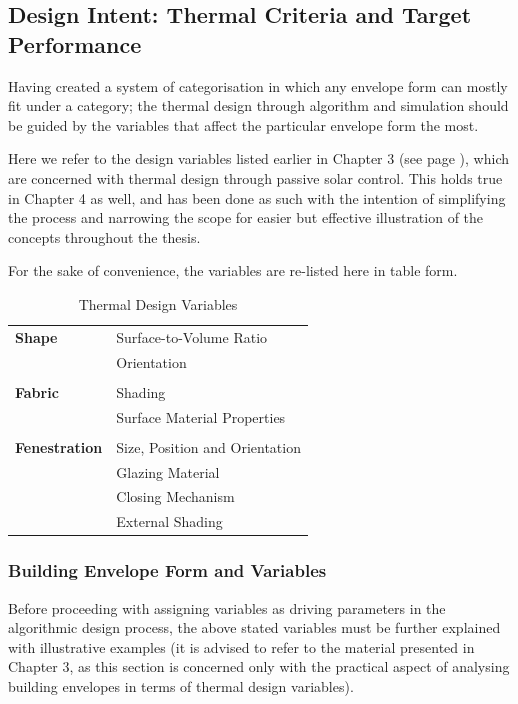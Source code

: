 \clearpage
\subsection{Design Intent: Thermal Criteria and Target Performance}
\label{sec:DesignIntent:Thermal}

Having created a system of categorisation in which any envelope form can mostly fit under a category; the thermal design through algorithm and simulation should be guided by the variables that affect the particular envelope form the most.

Here we refer to the design variables listed earlier in Chapter 3 (see page \pageref{sec:ThermalDesignVariables}), which are concerned with thermal design through passive solar control. This holds true in Chapter 4 as well, and has been done as such with the intention of simplifying the process and narrowing the scope for easier but effective illustration of the concepts throughout the thesis.

For the sake of convenience, the variables are re-listed here in table form.

\begin{table}[H]
	\centering
	\begin{tabular}{l|l}
		\textbf{Shape}		&Surface-to-Volume Ratio\\
					&Orientation\\
					&\\
		\textbf{Fabric} 	&Shading\\
					&Surface Material Properties\\
					&\\
		\textbf{Fenestration}	&Size, Position and Orientation\\
					&Glazing Material\\
					&Closing Mechanism\\
					&External Shading\\
	\end{tabular}
	\caption{Thermal Design Variables}
	\label{tab:ThermalDesignVariables}
\end{table}

\subsubsection{Building Envelope Form and Variables}

Before proceeding with assigning variables as driving parameters in the algorithmic design process, the above stated variables must be further explained with illustrative examples (it is advised to refer to the material presented in Chapter 3, as this section is concerned only with the practical aspect of analysing building envelopes in terms of thermal design variables).

